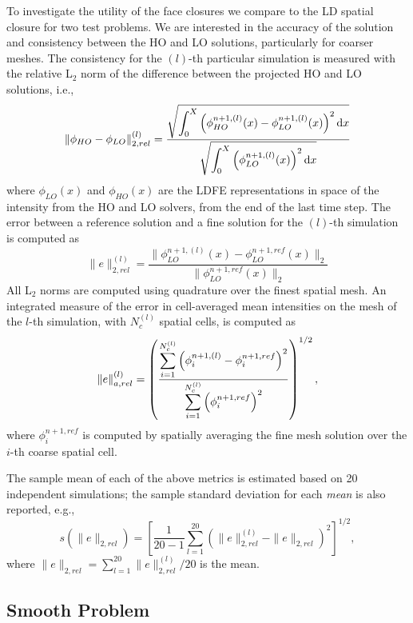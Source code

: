 To investigate the utility of the face closures we compare to the LD spatial
closure for two test problems.  We are interested in the accuracy of the solution and
consistency between the HO and LO solutions, particularly for coarser meshes. 
The consistency for the $(l)$-th particular simulation is measured with the relative L$_2$ norm
of the difference between the projected HO and LO solutions, i.e.,
\begin{equation}
    \|\phi_{HO} - \phi_{LO}\|^{(l)}_{2,rel} = \frac{\displaystyle \sqrt{\int_0^X \left(
        \phi_{HO}^{n+1,(l)}(x) - \phi_{LO}^{n+1,(l)}(x) \right)^2 \mathrm{d} x}}{\displaystyle \sqrt{
            \int_0^X \left(\phi_{LO}^{n+1,(l)}(x)\right)^2 \mathrm{d} x }}
\end{equation}
where $\phi_{LO}(x)$ and $\phi_{HO}(x)$ are the LDFE representations in space of the
intensity from the HO and LO solvers, from the end of the last time step.
The error between a reference solution and a fine solution for the ${(l)}$-th simulation
is computed as
\begin{equation}
    \|e\|^{{(l)}}_{2,rel} = \frac{\|\phi_{LO}^{n+1,{(l)}}(x) -
    \phi_{LO}^{n+1,ref}\left( x \right)\|_2}{\|\phi_{LO}^{n+1,ref}\left( x \right)\|_2}
\end{equation}
All L$_2$ norms are computed using quadrature over the finest spatial mesh.  An
integrated measure of the error in cell-averaged mean intensities on the mesh of the
$l$-th simulation, with $N_c^{(l)}$ spatial cells, is computed as
\begin{equation}
    \|e\|^{{(l)}}_{a,rel} = \left({\frac{\displaystyle \sum\limits_{i=1}^{N^{(l)}_c}
    \left(\phi_i^{n+1,{(l)}} - \phi_i^{n+1,ref}
\right)^2}{\displaystyle \sum\limits_{i=1}^{N^{(l)}_c}\left(\phi_i^{n+1,ref}\right)^2}}\right)^{1/2},
\end{equation}
where $\phi_i^{n+1,ref}$ is computed by spatially averaging the fine mesh solution over
the $i$-th coarse spatial cell.

The sample mean of each of the above metrics is estimated based on 20 independent
simulations; the sample standard deviation for each \emph{mean} is also reported, e.g.,
\begin{equation}
    s\left(\|e\|_{2,rel}\right) = \left[\frac{1}{20-1}\sum_{l=1}^{20} \left(
    \|e\|_{2,rel}^{(l)} - \|e\|_{2,rel} \right)^2\right]^{1/2},
\end{equation}
where $\|e\|_{2,rel}=\sum_{l=1}^{20}\|e\|_{2,rel}^{(l)}/20$ is the mean.

\subsection{Smooth Problem}


